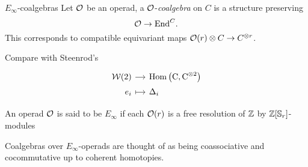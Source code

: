 \begin{frame}[fragile]{$E_\infty$-coalgebras}
	Let $\mathcal{O}$ be an operad, a $\mathcal{O}$-\textit{coalgebra} on $C$ is a structure preserving
	\[
	\mathcal{O} \to \mathrm{End}^C.
	\]
	\pause This corresponds to compatible equivariant maps $\mathcal{O}(r) \otimes C \to C^{\otimes r}$.

	\medskip \pause	Compare with Steenrod's	\vspace*{-5pt}
	\[
	\begin{tikzcd}[%
		row sep=tiny,
		column sep = small,
		,row sep = 0ex
		,/tikz/column 1/.append style={anchor=base east}
		,/tikz/column 2/.append style={anchor=base west}
		]
		\cW(2) \arrow[r] & \Hom \left( \gchains, \gchains^{\otimes 2} \right) \\
		e_i \arrow[r, |->] & \Delta_i
	\end{tikzcd}
	\]

	\pause \vspace*{-10pt}
	\begin{definition}
		An operad $\mathcal{O}$ is said to be $E_\infty$ if each $\mathcal{O}(r)$ is a free resolution of $\mathbb{Z}$ by $\mathbb{Z}[\mathbb{S}_r]$-modules
	\end{definition}

	\smallskip \pause Coalgebras over $E_\infty$-operads are thought of as being coassociative and cocommutative up to coherent homotopies.
\end{frame}

